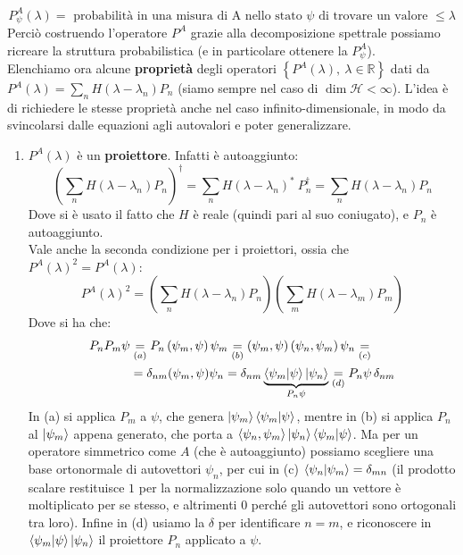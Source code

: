 \documentclass[../../FisicaTeorica.tex]{subfiles}
\begin{document}
\[
P_\psi^A\left(\lambda\right)=\text{ probabilità in una misura di A nello stato $\psi$  di trovare un valore }\leq \lambda 
\]
Perciò costruendo l'operatore $P^A$ grazie alla decomposizione spettrale possiamo ricreare la struttura probabilistica (e in particolare ottenere la  $P^A_\psi$).\\
Elenchiamo ora alcune \textbf{proprietà} degli operatori $\left\{P^A\left(\lambda\right),\ \lambda\in\mathbb{R}\right\}$ dati da $P^A(\lambda) = \sum_n H(\lambda-\lambda_n)P_n$
(siamo sempre nel caso di $\dim{\mathcal{H}}<\infty$). L'idea è di richiedere le stesse proprietà anche nel caso infinito-dimensionale, in modo da svincolarsi dalle equazioni agli autovalori e poter generalizzare.
\begin{enumerate}
    \item $P^A(\lambda)$ è un \textbf{proiettore}. Infatti è autoaggiunto:
    \[
	\left(\sum_{n}{H\left(\lambda-\lambda_n\right)P_n}\right)^\dag=\sum_{n}{H\left(\lambda-\lambda_n\right)^\ast\ P_n^\dag}=\sum_{n}{H\left(\lambda-\lambda_n\right)P_n}
	\]
	Dove si è usato il fatto che $H$ è reale (quindi pari al suo coniugato), e $P_n$ è autoaggiunto.\\
	Vale anche la seconda condizione per i proiettori, ossia che $P^A(\lambda)^2 = P^A(\lambda)$:
	\begin{equation}
	P^A\left(\lambda\right)^2
	=\left(\sum_{n}{H\left(\lambda-\lambda_n\right)P_n}\right)\left(\sum_{m}{H\left(\lambda-\lambda_m\right)P_m}\right)
	\label{eqn:PAquadro}
	\end{equation}
	Dove si ha che:
	\begin{align*}
	P_nP_m\psi&\underset{(a)}{=}P_n\left(\psi_m,\psi\right)\psi_m \underset{(b)}{=}\left(\psi_m,\psi\right)\left(\psi_n,\psi_m\right)\psi_n \underset{(c)}{=}\\
	&= \delta_{nm}(\psi_m, \psi) \psi_n = 
	\delta_{nm}\underbrace{\braket{\psi_m | \psi}\ket{\psi_n}}_{P_n\psi}  \underset{(d)}{=} 
	P_n\psi\,\delta_{nm}
	\end{align*}
	In (a) si applica $P_m$ a $\psi$, che genera $\ket{\psi_m}\braket{\psi_m|\psi}$, mentre in (b) si applica $P_n$ al $\ket{\psi_m}$ appena generato, che porta a $\braket{\psi_n, \psi_m}\ket{\psi_n} \braket{\psi_m|\psi}$. Ma per un operatore simmetrico come $A$ (che è autoaggiunto) possiamo scegliere una base ortonormale di autovettori $\psi_n$, per cui in (c) $\braket{\psi_n|\psi_m} = \delta_{mn}$ (il prodotto scalare restituisce $1$ per la normalizzazione solo quando un vettore è moltiplicato per se stesso, e altrimenti $0$ perché gli autovettori sono ortogonali tra loro). Infine in (d) usiamo la $\delta$ per identificare $n=m$, e riconoscere in $\braket{\psi_m | \psi}\ket{\psi_n}$ il proiettore $P_n$ applicato a $\psi$.\\

\end{enumerate}
\end{document}
